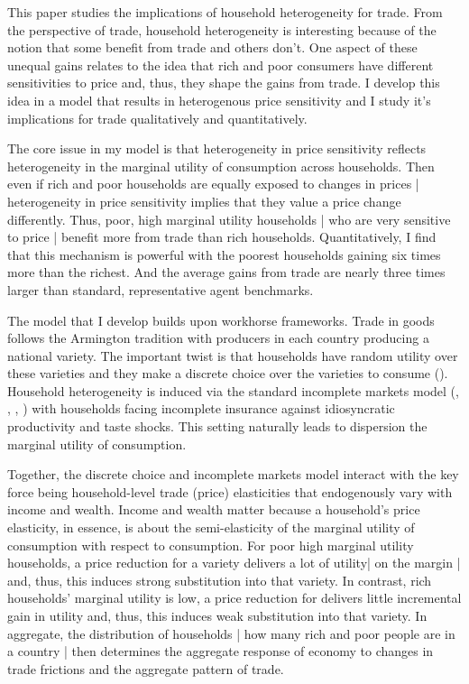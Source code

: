 \documentclass[12pt,pdftex]{article}
\begin{document}
\begin{onehalfspacing}
\hspace{-0.05cm}



\thispagestyle{empty}
\newpage
\normalsize

This paper studies the implications of household heterogeneity for trade. From the perspective of trade, household heterogeneity is interesting because of the notion that some benefit from trade and others don't. One aspect of these unequal gains relates to the idea that rich and poor consumers have different sensitivities to price and, thus, they shape the gains from trade.  I develop this idea in a model that results in heterogenous price sensitivity and I study it's implications for trade qualitatively and quantitatively.

The core issue in my model is that heterogeneity in price sensitivity reflects heterogeneity in the marginal utility of consumption across households. Then even if rich and poor households are equally exposed to changes in prices | heterogeneity in price sensitivity implies that they value a price change differently. Thus, poor, high marginal utility households | who are very sensitive to price | benefit more from trade than rich households. Quantitatively, I find that this mechanism is powerful with the poorest households gaining six times more than the richest. And the average gains from trade are nearly three times larger than standard, representative agent benchmarks.

The model that I develop builds upon workhorse frameworks. Trade in goods follows the Armington tradition with producers in each country producing a national variety. The important twist is that households have random utility over these varieties and they make a discrete choice over the varieties to consume (\citet{mcfadden1974frontiers}).  Household heterogeneity is induced via the standard incomplete markets model (\citet{bewley1979optimum}, \citet{imrohorouglu1989cost}, \citet{huggett1993risk}, \citet{aiyagari1994uninsured}) with households facing incomplete insurance against idiosyncratic productivity and taste shocks. This setting naturally leads to dispersion the marginal utility of consumption.

Together, the discrete choice and incomplete markets model interact with the key force being household-level trade (price) elasticities that endogenously vary with income and wealth. Income and wealth matter because a household's price elasticity, in essence, is about the semi-elasticity of the marginal utility of consumption with respect to consumption. For poor high marginal utility households, a price reduction for a variety delivers a lot of utility| on the margin | and, thus, this induces strong substitution into that variety. In contrast, rich households' marginal utility is low, a price reduction for delivers little incremental gain in utility and, thus, this induces weak substitution into that variety. In aggregate, the distribution of households | how many rich and poor people are in a country | then determines the aggregate response of economy to changes in trade frictions and the aggregate pattern of trade.


\end{onehalfspacing}
\end{document}
